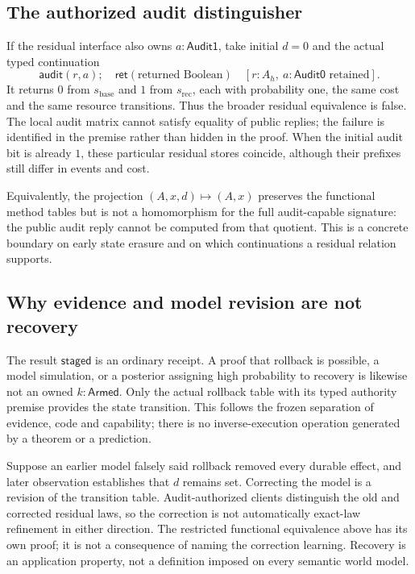 \documentclass[11pt,a4paper]{article}
\theoremstyle{definition}
\newcommand{\Ret}{\mathsf{ret}}
\begin{document}
\subsection{The authorized audit distinguisher}
If the residual interface also owns $a:\mathsf{Audit1}$, take initial
$d=0$ and the actual typed continuation
\[
 \mathsf{audit}(r,a);\quad\Ret(\text{returned Boolean})
 \quad [r:A_h,\ a:\mathsf{Audit0}\text{ retained}].
\]
It returns $0$ from $s_{\mathrm{base}}$ and $1$ from
$s_{\mathrm{rec}}$, each with probability one, the same cost and the same
resource transitions. Thus the broader residual equivalence is false.
The local audit matrix cannot satisfy equality of public replies; the
failure is identified in the premise rather than hidden in the proof.
When the initial audit bit is already $1$, these particular residual
stores coincide, although their prefixes still differ in events and cost.

Equivalently, the projection $(A,x,d)\mapsto(A,x)$ preserves the
functional method tables but is not a homomorphism for the full
audit-capable signature: the public audit reply cannot be computed from
that quotient. This is a concrete boundary on early state erasure and
on which continuations a residual relation supports.

\subsection{Why evidence and model revision are not recovery}
The result $\mathsf{staged}$ is an ordinary receipt. A proof that
rollback is possible, a model simulation, or a posterior assigning high
probability to recovery is likewise not an owned $k:\mathsf{Armed}$.
Only the actual rollback table with its typed authority premise provides
the state transition. This follows the frozen separation of evidence,
code and capability; there is no inverse-execution operation generated
by a theorem or a prediction.

Suppose an earlier model falsely said rollback removed every durable
effect, and later observation establishes that $d$ remains set. Correcting
the model is a revision of the transition table. Audit-authorized clients
distinguish the old and corrected residual laws, so the correction is
not automatically exact-law refinement in either direction. The restricted
functional equivalence above has its own proof; it is not a consequence
of naming the correction learning. Recovery is an application property,
not a definition imposed on every semantic world model.
\end{document}
